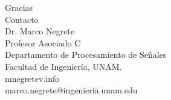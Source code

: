 \documentclass[10pt,spanish,aspectratio=1610]{beamer}
\begin{document}
\begin{frame}
  \Huge{Gracias}
  \[\]
  \Large{Contacto}
  \[\]
  \large
  Dr. Marco Negrete\\
  Profesor Asociado C\\
  Departamento de Procesamiento de Señales\\
  Facultad de Ingeniería, UNAM.
\[\]
mnegretev.info\\
marco.negrete@ingenieria.unam.edu\\
\end{frame}



\end{document}
